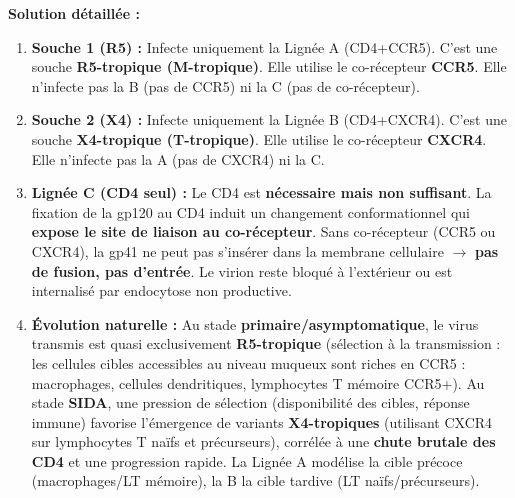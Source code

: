 \documentclass[11pt]{article}
\newcounter{popsec}
\newcounter{popsub}
\newcommand{\courssub}[1]{%
  \stepcounter{popsub}%
  \par\vspace{9pt}\noindent{\popxbold\fontsize{11.5}{13}\selectfont\color{popink}{\color{poporange}\thepopsec.\thepopsub}\hspace{6pt}#1}\par\nopagebreak\vspace{4pt}
}
\begin{document}
\begin{exoresolu}
\tcblower
\textbf{Solution détaillée :}
\begin{enumerate}
    \item \textbf{Souche 1 (R5) :} Infecte uniquement la Lignée A (CD4+CCR5). C'est une souche \textbf{R5-tropique (M-tropique)}. Elle utilise le co-récepteur \textbf{CCR5}. Elle n'infecte pas la B (pas de CCR5) ni la C (pas de co-récepteur).
    \item \textbf{Souche 2 (X4) :} Infecte uniquement la Lignée B (CD4+CXCR4). C'est une souche \textbf{X4-tropique (T-tropique)}. Elle utilise le co-récepteur \textbf{CXCR4}. Elle n'infecte pas la A (pas de CXCR4) ni la C.
    \item \textbf{Lignée C (CD4 seul) :} Le CD4 est \textbf{nécessaire mais non suffisant}. La fixation de la gp120 au CD4 induit un changement conformationnel qui \textbf{expose le site de liaison au co-récepteur}. Sans co-récepteur (CCR5 ou CXCR4), la gp41 ne peut pas s'insérer dans la membrane cellulaire $\rightarrow$ \textbf{pas de fusion, pas d'entrée}. Le virion reste bloqué à l'extérieur ou est internalisé par endocytose non productive.
    \item \textbf{Évolution naturelle :} Au stade \textbf{primaire/asymptomatique}, le virus transmis est quasi exclusivement \textbf{R5-tropique} (sélection à la transmission : les cellules cibles accessibles au niveau muqueux sont riches en CCR5 : macrophages, cellules dendritiques, lymphocytes T mémoire CCR5+). Au stade \textbf{SIDA}, une pression de sélection (disponibilité des cibles, réponse immune) favorise l'émergence de variants \textbf{X4-tropiques} (utilisant CXCR4 sur lymphocytes T naïfs et précurseurs), corrélée à une \textbf{chute brutale des CD4} et une progression rapide. La Lignée A modélise la cible précoce (macrophages/LT mémoire), la B la cible tardive (LT naïfs/précurseurs).
\end{enumerate}
\end{exoresolu}

\courssub{Bilan de la section 1}
\end{document}
